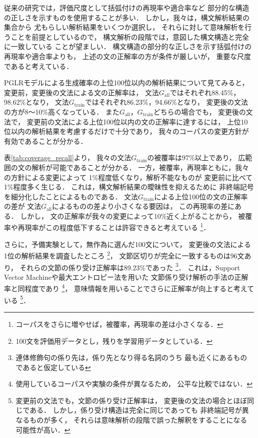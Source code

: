 従来の研究では，評価尺度として括弧付けの再現率や適合率など
部分的な構造の正しさを示すものを使用することが多い．
しかし，我々は，構文解析結果の集合から
尤もらしい解析結果をいくつか選択し，
それらに対して意味解析を行うことを前提としているので，
構文解析の段階では，意図した構文構造と完全に一致している
ことが望ましい．
構文構造の部分的な正しさを示す括弧付けの再現率や適合率よりも，
上述の文の正解率の方が条件が厳しいが，
重要な尺度であると考えている．

PGLRモデルによる生成確率の上位100位以内の解析結果について見てみると，
変更前，変更後の文法による文の正解率は，
文法$G_{\mbox{all}}$ではそれぞれ88.45\%，98.62\%となり，
文法$G_{\mbox{train}}$ではそれぞれ86.23\%，94.66\%となり，
変更後の文法の方が8〜10\%高くなっている．
また$G_{\mbox{all}}$，$G_{\mbox{train}}$どちらの場合でも，
変更後の文法で，
変更前の文法による上位100位以内の文の正解率に達するには，
上位10位以内の解析結果を考慮するだけで十分であり，
我々のコーパスの変更方針が有効であることが分かる．

表\ref{tab:coverage_recall}より，
我々の文法$G_{\mbox{train}}$の被覆率は97\%以上であり，
広範囲の文の解析が可能であることが分かる．
一方，被覆率，再現率ともに，我々の方針による変更によって
1\%程度低くなり，解析不能なものが
変更前に比べて1\%程度多く生じる．
これは，構文解析結果の曖昧性を抑えるために
非終端記号を細分化したことによるものである．
文法$G_{\mbox{train}}$による上位100位の文の正解率の差が
文法$G_{\mbox{all}}$によるものの差より小さくなる要因は，
この再現率の差にある．
しかし，
文の正解率が我々の変更によって10\%近く上がることから，
被覆率や再現率がこの程度低下することは許容できると考えている
\footnote{コーパスをさらに増やせば，被覆率，再現率の差は小さくなる．}．

さらに，予備実験として，無作為に選んだ100文について，
変更後の文法による1位の解析結果を調査したところ
\footnote{100文を評価用データとし，残りを学習用データとしている．}，
文節区切りが完全に一致するものは96文あり，
それらの文節の係り受け正解率は89.23\%であった
\footnote{連体修飾句の係り先は，係り先となり得る名詞のうち
最も近くにあるものであると仮定している}．
これは，Support Vector Machineや最大エントロピー法を用いた
文節係り受け解析の手法の正解率と同程度であり
\cite{uchimoto:99,kudo:2002}
\footnote{使用しているコーパスや実験の条件が異なるため，
公平な比較ではない．}，
意味情報を用いることでさらに正解率が向上すると考えている
\footnote{変更前の文法でも，文節の係り受け正解率は，
変更後の文法の場合とほぼ同じである．
しかし，係り受け構造は完全に同じであっても
非終端記号が異なるものが多く，
それらは意味解析の段階で誤った解釈をすることになる可能性が高い．}．
\fi


